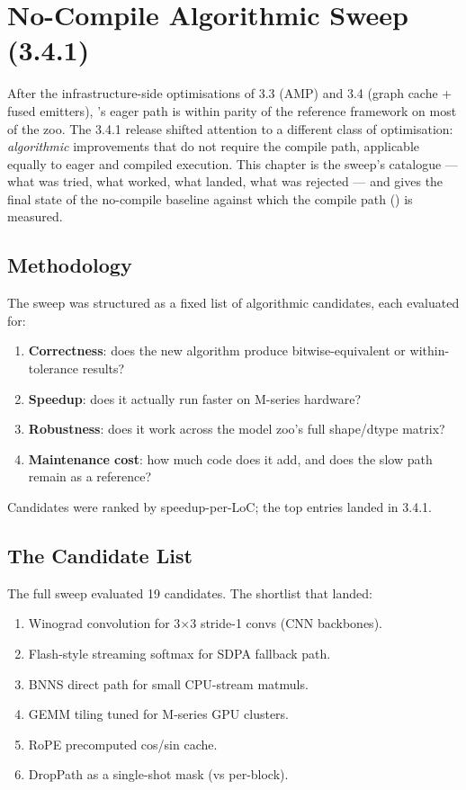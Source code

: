 \chapter{No-Compile Algorithmic Sweep (3.4.1)}
\label{ch:no_compile_sweep}

After the infrastructure-side optimisations of 3.3 (AMP) and
3.4 (graph cache + fused emitters), \Lucid's eager path is
within parity of the reference framework on most of the
zoo. The 3.4.1 release shifted attention to a different class
of optimisation: \emph{algorithmic} improvements that do not
require the compile path, applicable equally to eager and
compiled execution. This chapter is the sweep's catalogue ---
what was tried, what worked, what landed, what was rejected ---
and gives the final state of the no-compile baseline against
which the compile path () is measured.

\section{Methodology}
\label{sec:no_compile_sweep:methodology_outline}

The sweep was structured as a fixed list of algorithmic
candidates, each evaluated for:

\begin{enumerate}
  \item \textbf{Correctness}: does the new algorithm produce
    bitwise-equivalent or within-tolerance results?
  \item \textbf{Speedup}: does it actually run faster on
    M-series hardware?
  \item \textbf{Robustness}: does it work across the model
    zoo's full shape/dtype matrix?
  \item \textbf{Maintenance cost}: how much code does it add,
    and does the slow path remain as a reference?
\end{enumerate}

Candidates were ranked by speedup-per-LoC; the top entries
landed in 3.4.1.

\section{The Candidate List}
\label{sec:no_compile_sweep:candidates}

The full sweep evaluated 19 candidates. The shortlist that
landed:

\begin{enumerate}
  \item Winograd convolution for 3$\times$3 stride-1 convs
    (CNN backbones).
  \item Flash-style streaming softmax for SDPA fallback path.
  \item BNNS direct path for small CPU-stream matmuls.
  \item GEMM tiling tuned for M-series GPU clusters.
  \item RoPE precomputed cos/sin cache.
  \item DropPath as a single-shot mask (vs per-block).
\end{enumerate}

